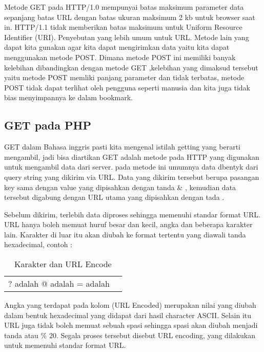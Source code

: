 Metode GET pada HTTP/1.0 mempunyai batas maksimum parameter data sepanjang batas URL dengan batas ukuran maksimum 2 kb untuk browser 
saat in. HTTP/1.1 tidak memberikan batas maksimum untuk Uniform Resource Identifier (URI). Penyebutan yang lebih umum untuk URL. Metode 
lain yang dapat kita gunakan agar kita dapat  mengirimkan data yaitu kita dapat menggunakan  metode POST. Dimana metode  POST ini 
memiliki banyak kelebihan dibandingkan dengan  metode GET ,kelebihan yang dimaksud tersebut yaitu metode POST  memliki panjang 
parameter dan tidak  terbatas,  metode POST tidak dapat terlihat oleh pengguna  seperti manusia dan  kita juga tidak bias menyimpannya 
ke dalam bookmark.

\subsection{GET pada PHP}
GET dalam Bahasa inggris pasti kita mengenal istilah getting yang berarti mengambil, jadi bisa diartikan GET adalah metode pada HTTP 
yang digunakan untuk mengambil data dari server. pada metode ini umumnya data dbentyk dari query string yang dikirim via URL. Data yang 
dikirim tersebut berupa pasangan key sama dengan value yang dipisahkan dengan tanda \& , kemudian data tersebut digabung dengan URL 
utama yang dipisahkan dengan tada \? . 

Sebelum dikirim, terlebih data diproses sehingga memenuhi standar format URL. URL hanya boleh memuat huruf besar dan kecil, angka dan 
beberapa karakter lain. Karakter di luar itu akan diubah ke format tertentu yang diawali tanda %
hexadecimal, contoh :

\begin{table} [ht]
\caption{Karakter dan URL Encode}
\centering
\begin {tabular} {|cc|}
\hline
? adalah %
\hline
@ adalah %
\hline
= adalah %
\hline
\end{tabular}
\label{ltabel}
\end{table}
 
Angka yang terdapat pada kolom (URL Encoded) merupakan nilai yang diubah dalam bentuk hexadecimal yang didapat dari hasil character 
ASCII. Selain itu URL juga tidak boleh memuat sebuah spasi sehingga spasi akan diubah menjadi tanda \+ atau \% 20. Segala proses 
tersebut disebut URL encoding, yang dilakukan untuk memenuhi standar format URL.  
 
